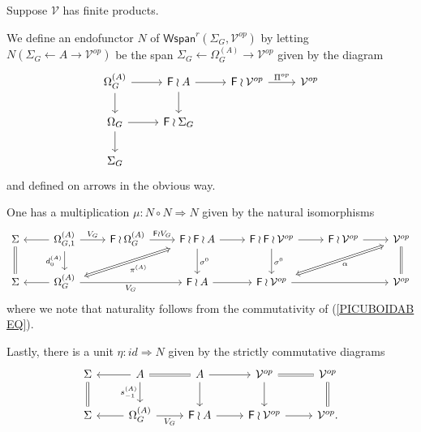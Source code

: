 \documentclass[a4paper,10pt]{article}%
\begin{document}
\begin{definition}
	Suppose $\mathcal{V}$ has finite products.
	
	We define an endofunctor $N$ of 
	$\mathsf{Wspan}^r(\Sigma_G,\mathcal{V}^{op})$
	by letting $N(\Sigma_G \leftarrow A \to \mathcal{V}^{op})$
	be the span $\Sigma_G \leftarrow \Omega^{(A)}_G \to \mathcal{V}^{op}$ given by the diagram
\[
	\begin{tikzcd}
	\Omega^{(A)}_G \ar{r} \ar{d}&
	\Fin \wr A \ar{r} \ar{d}&
	\Fin \wr \mathcal{V}^{op} \ar{r}{\Pi^{op}} &
	\mathcal{V}^{op}
\\
	\Omega_G \ar{r} \ar{d} &
	\Fin \wr \Sigma_G
\\
	\Sigma_G
	\end{tikzcd}
\]
and defined on arrows in the obvious way.

One has a multiplication $\mu \colon N \circ N \Rightarrow N$ given by the natural isomorphisms
\begin{equation}\label{MULTDEFSPAN EQ}
	\begin{tikzcd}
	\Sigma \ar[equal]{d}&
	\Omega_{G,1}^{(A)} \ar{r}{V_G} \ar{d}[swap]{d_{0}^{(A)}} \ar{l}&
	\Fin \wr \Omega_{G}^{(A)} \ar{r}{\Fin \wr V_G} &
	|[alias=FFOmega]|\Fin \wr \Fin \wr A \ar{d}{\sigma^0} \ar{r} &
	\Fin \wr \Fin \wr \mathcal{V}^{op} \ar{d}{\sigma^0} \ar{r} &
	\Fin \wr \mathcal{V}^{op} \ar{r} &
	|[alias=dog]|
	\mathcal{V}^{op} \ar[equal]{d}
\\
	\Sigma &
	|[alias=Omega]|\Omega_{G}^{(A)} \ar{rr}[swap]{V_G} \ar{l}&&
	\Fin \wr A \ar{r} &
	|[alias=cat]|
	\Fin \wr \mathcal{V}^{op} \ar{rr} &&
	\mathcal{V}^{op}
	\arrow[Leftrightarrow, from=FFOmega, to=Omega,shorten <=0.15cm,,shorten >=0.15cm,"\pi^{(A)}"]
	\arrow[Leftrightarrow, from=dog, to=cat,shorten <=0.15cm,,shorten >=0.15cm,"\alpha"]
	\end{tikzcd}
\end{equation}
where we note that naturality follows from the commutativity of 
(\ref{PICUBOIDAB EQ}).

Lastly, there is a unit $\eta \colon id \Rightarrow N$ given by the strictly commutative diagrams
\begin{equation}\label{UNITSPAN EQ}
	\begin{tikzcd}
	\Sigma \ar[equal]{d} &
	A \ar{l} \ar{d}[swap]{s_{-1}^{(A)}} \ar[equal]{r} &
	A \ar{d} \ar{r} &
	\mathcal{V}^{op} \ar{d} \ar[equal]{r}&
	\mathcal{V}^{op} \ar[equal]{d}
\\
	\Sigma &
	\Omega_G^{(A)} \ar{l} \ar{r}[swap]{V_G}&
	\Fin \wr A \ar{r} &
	\Fin \wr \mathcal{V}^{op} \ar{r} &
	\mathcal{V}^{op}.
	\end{tikzcd}
\end{equation}	
\end{definition}
\end{document}
